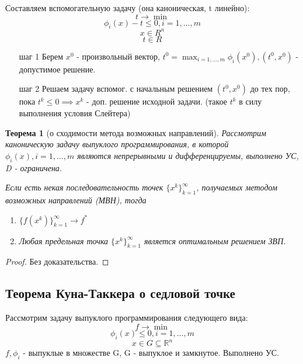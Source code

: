 \documentclass[a4paper]{article}
\newtheorem{theorem}{Теорема}[section]
\theoremstyle{definition}
\theoremstyle{remark}
\begin{document}
Составляем вспомогательную задачу (она каноническая, t линейно):
\[t \to \min\]
\[\phi_i(x) - t \le 0, i = 1, \dots, m\]
\[x\in R^n\]
\[t\in R\]
\begin{itemize}
    \item[шаг 1] Берем $x^0$ - произвольный вектор, $t^0 = \max_{i = 1, \dots, m}\phi_i(x^0), (t^0, x^0)$ - допустимое решение.
    \item[шаг 2] Решаем задачу вспомог. с начальным решением $(t^0, x^0)$ до тех пор, пока $t^k\le 0\implies x^k$ - доп. решение исходной задачи. (такое $t^k$ в силу выполнения условия Слейтера)
\end{itemize}
\begin{theorem}[о сходимости метода возможных направлений]
    Рассмотрим каноническую задачу выпуклого программирования, в которой $\phi_i(x), i = 1, \dots, m$ являются непрерывными и дифференцируемы, выполнено УС, D - ограничена.

    Если есть некая последовательность точек $\{x^k\}_{k = 1}^\infty$, получаемых методом возможных направлений (МВН), тогда
    \begin{enumerate}
        \item $\{f(x^k)\}_{k = 1}^\infty \to f^*$
        \item Любая предельная точка $\{x^k\}_{k = 1}^\infty$ является оптимальным решением ЗВП.
    \end{enumerate} 
\end{theorem}
\begin{proof}
    Без доказательства.
\end{proof}
\subsection{Теорема Куна-Таккера о седловой точке}
Рассмотрим задачу выпуклого программирования следующего вида:
\[f\to \min\]
\[\phi_i(x)\le 0, i = 1, \dots, m\]
\[x \in G \subseteq \mathbb{R}^n\]
$f, \phi_i$ - выпуклые в множестве G, G - выпуклое и замкнутое. Выполнено УС.
\end{document}
